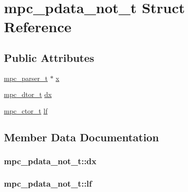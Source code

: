 \hypertarget{structmpc__pdata__not__t}{}\section{mpc\+\_\+pdata\+\_\+not\+\_\+t Struct Reference}
\label{structmpc__pdata__not__t}
\subsection*{Public Attributes}
\begin{DoxyCompactItemize}
\item 
\hyperlink{structmpc__parser__t}{mpc\+\_\+parser\+\_\+t} $\ast$ \hyperlink{structmpc__pdata__not__t_ad85e877b39bdaa6993d93ad5f8fbe2e9}{x}
\item 
\hyperlink{mpc_8h_aa06bd80d555077ce004dc04a85d2b781}{mpc\+\_\+dtor\+\_\+t} \hyperlink{structmpc__pdata__not__t_a000411de5ef39db4541e3bd348401734}{dx}
\item 
\hyperlink{mpc_8h_adfa0bdc52cd524f253094dc148c4a913}{mpc\+\_\+ctor\+\_\+t} \hyperlink{structmpc__pdata__not__t_a60eb7e78bd074b7eb7fb4210b7c4420c}{lf}
\end{DoxyCompactItemize}


\subsection{Member Data Documentation}
\hypertarget{structmpc__pdata__not__t_a000411de5ef39db4541e3bd348401734}{}
\subsubsection[{dx}]{ mpc\+\_\+pdata\+\_\+not\+\_\+t\+::dx}\label{structmpc__pdata__not__t_a000411de5ef39db4541e3bd348401734}
\hypertarget{structmpc__pdata__not__t_a60eb7e78bd074b7eb7fb4210b7c4420c}{}
\subsubsection[{lf}]{ mpc\+\_\+pdata\+\_\+not\+\_\+t\+::lf}\label{structmpc__pdata__not__t_a60eb7e78bd074b7eb7fb4210b7c4420c}
\hypertarget{structmpc__pdata__not__t_ad85e877b39bdaa6993d93ad5f8fbe2e9}{}
